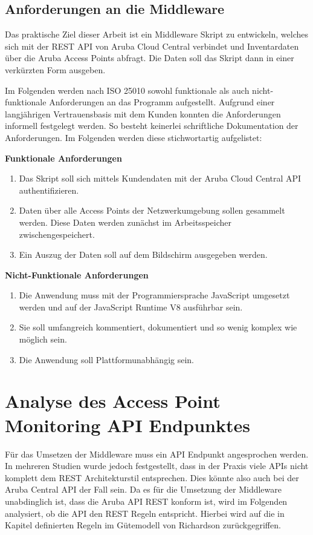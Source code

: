 \subsection{Anforderungen an die Middleware}

Das praktische Ziel dieser Arbeit ist ein Middleware Skript zu entwickeln, welches sich mit der REST API von Aruba Cloud Central verbindet und Inventardaten über die Aruba Access Points abfragt. Die Daten soll das Skript dann in einer verkürzten Form ausgeben.

Im Folgenden werden nach ISO 25010 sowohl funktionale als auch nicht-funktionale Anforderungen an das Programm aufgestellt. Aufgrund einer langjährigen Vertrauensbasis mit dem Kunden konnten die Anforderungen informell festgelegt werden. So besteht keinerlei schriftliche Dokumentation der Anforderungen. Im Folgenden werden diese stichwortartig aufgelistet:

\textbf{Funktionale Anforderungen}

\begin{enumerate}
    \item Das Skript soll sich mittels Kundendaten mit der Aruba Cloud Central API authentifizieren.
    \item Daten über alle Access Points der Netzwerkumgebung sollen gesammelt werden. Diese Daten werden zunächst im Arbeitsspeicher zwischengespeichert.
    \item Ein Auszug der Daten soll auf dem Bildschirm ausgegeben werden. 
\end{enumerate}

\textbf{Nicht-Funktionale Anforderungen}

\begin{enumerate}
    \item Die Anwendung muss mit der Programmiersprache JavaScript umgesetzt werden und auf der JavaScript Runtime V8 ausführbar sein.
    \item Sie soll umfangreich kommentiert, dokumentiert und so wenig komplex wie möglich sein.
    \item Die Anwendung soll Plattformunabhängig sein.
    
\end{enumerate}

\section{Analyse des Access Point Monitoring API Endpunktes}

Für das Umsetzen der Middleware muss ein API Endpunkt angesprochen werden. In mehreren Studien wurde jedoch festgestellt, dass in der Praxis viele APIs nicht komplett dem REST Architekturstil entsprechen. Dies könnte also auch bei der Aruba Central API der Fall sein. Da es für die Umsetzung der Middleware unabdinglich ist, dass die Aruba API REST konform ist, wird im Folgenden analysiert, ob die API den REST Regeln entspricht. Hierbei wird auf die in Kapitel definierten Regeln im Gütemodell von Richardson zurückgegriffen.

